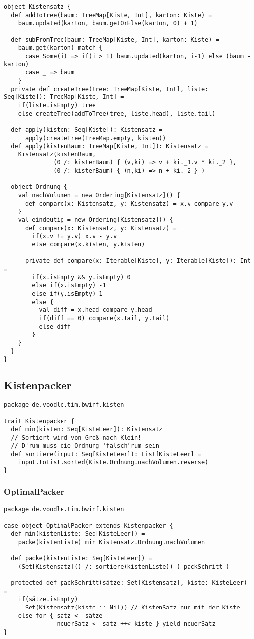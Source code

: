 \begin{lstlisting}
object Kistensatz {
  def addToTree(baum: TreeMap[Kiste, Int], karton: Kiste) =
    baum.updated(karton, baum.getOrElse(karton, 0) + 1)
  
  def subFromTree(baum: TreeMap[Kiste, Int], karton: Kiste) =
    baum.get(karton) match {
      case Some(i) => if(i > 1) baum.updated(karton, i-1) else (baum - karton)
      case _ => baum
    }
  private def createTree(tree: TreeMap[Kiste, Int], liste: Seq[Kiste]): TreeMap[Kiste, Int] =
    if(liste.isEmpty) tree
    else createTree(addToTree(tree, liste.head), liste.tail)

  def apply(kisten: Seq[Kiste]): Kistensatz =
      apply(createTree(TreeMap.empty, kisten))
  def apply(kistenBaum: TreeMap[Kiste, Int]): Kistensatz =
    Kistensatz(kistenBaum,
              (0 /: kistenBaum) { (v,ki) => v + ki._1.v * ki._2 },
              (0 /: kistenBaum) { (n,ki) => n + ki._2 } )

  object Ordnung {
    val nachVolumen = new Ordering[Kistensatz]() {
      def compare(x: Kistensatz, y: Kistensatz) = x.v compare y.v
    }
    val eindeutig = new Ordering[Kistensatz]() {
      def compare(x: Kistensatz, y: Kistensatz) =
        if(x.v != y.v) x.v - y.v
        else compare(x.kisten, y.kisten)

      private def compare(x: Iterable[Kiste], y: Iterable[Kiste]): Int =
        if(x.isEmpty && y.isEmpty) 0
        else if(x.isEmpty) -1
        else if(y.isEmpty) 1
        else {
          val diff = x.head compare y.head
          if(diff == 0) compare(x.tail, y.tail)
          else diff
        }
    }
  }
}
\end{lstlisting}
\subsection{Kistenpacker}
\begin{lstlisting}
package de.voodle.tim.bwinf.kisten

trait Kistenpacker {
  def min(kisten: Seq[KisteLeer]): Kistensatz
  // Sortiert wird von Groß nach Klein!
  // D'rum muss die Ordnung 'falsch'rum sein
  def sortiere(input: Seq[KisteLeer]): List[KisteLeer] =
    input.toList.sorted(Kiste.Ordnung.nachVolumen.reverse)
}
\end{lstlisting}
\subsubsection{OptimalPacker}
\begin{lstlisting}
package de.voodle.tim.bwinf.kisten

case object OptimalPacker extends Kistenpacker {
  def min(kistenListe: Seq[KisteLeer]) =
    packe(kistenListe) min Kistensatz.Ordnung.nachVolumen
 
  def packe(kistenListe: Seq[KisteLeer]) =
    (Set[Kistensatz]() /: sortiere(kistenListe)) ( packSchritt )

  protected def packSchritt(sätze: Set[Kistensatz], kiste: KisteLeer) =
    if(sätze.isEmpty)
      Set(Kistensatz(kiste :: Nil)) // KistenSatz nur mit der Kiste
    else for { satz <- sätze
               neuerSatz <- satz ++< kiste } yield neuerSatz
}
\end{lstlisting}
